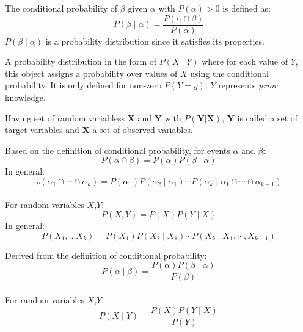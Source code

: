 {%
  The conditional probability of $\beta$ given $\alpha$ with $P(\alpha)>0$ is defined as:
  \begin{equation*}
    P(\beta\mid\alpha)=\frac{P(\alpha\cap\beta)}{P(\alpha)}
  \end{equation*}
  $P(\beta\mid\alpha)$ is a \gls{probability distribution} since it satisfies its properties.
}

{%
  A \gls{probability distribution} in the form of $P(X\mid Y)$ where for each value of $Y$, this object assigns a probability over values of $X$ using the \gls{conditional probability}. It is only defined for non-zero $P(Y=y)$. $Y$ represents \textit{prior} knowledge.

  Having \glspl{set of random variables} $\bm{X}$ and $\bm{Y}$ with $P(\bm{Y}|\bm{X})$, $\bm{Y}$ is called a set of \glspl{target variable} and $\bm{X}$ a set of \glspl{observed variable}.
}

{%
  Based on the definition of \gls{conditional probability}, for events $\alpha$ and $\beta$:
  \begin{equation*}
    P(\alpha\cap\beta)=P(\alpha)P(\beta\mid\alpha)
  \end{equation*}
  In general:
  \begin{equation*}
    _P(\alpha_1\cap\cdots\cap\alpha_k)=P(\alpha_1)P(\alpha_2\mid\alpha_1)\cdots P(\alpha_k\mid\alpha_1\cap\cdots\cap\alpha_{k-1})
  \end{equation*}\\[0.1cm]
  For \glspl{random variable} $X$,$Y$:
  \begin{equation*}
    P(X,Y)=P(X)P(Y\mid X)
  \end{equation*}
  In general:
  \begin{equation*}
    P(X_1,\dots X_k)=P(X_1)P(X_2\mid X_1)\cdots P(X_k\mid X_1,\cdots,X_{k-1})
  \end{equation*}

}

{%
  Derived from the definition of \gls{conditional probability}:
  \begin{equation*}
    P(\alpha\mid\beta)=\frac{P(\alpha)P(\beta\mid\alpha)}{P(\beta)}
  \end{equation*}\\[0.1cm]

  For \glspl{random variable} $X$,$Y$:
  \begin{equation*}
    P(X\mid Y)=\frac{P(X)P(Y\mid X)}{P(Y)}
  \end{equation*}
}

